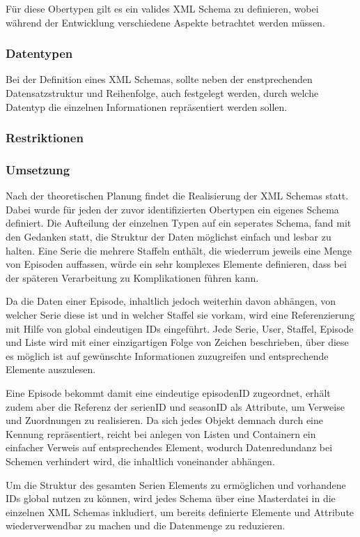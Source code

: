 \documentclass[a4paper]{article}
\begin{document}
Für diese Obertypen gilt es ein valides XML Schema zu definieren, wobei während der Entwicklung verschiedene Aspekte betrachtet werden müssen.  


\subsubsection{Datentypen}
Bei der Definition eines XML Schemas, sollte neben der enstprechenden Datensatzstruktur und Reihenfolge,
auch festgelegt werden, durch welche Datentyp die einzelnen Informationen repräsentiert werden sollen.


\subsubsection{Restriktionen}

\newpage
\subsubsection{Umsetzung}

Nach der theoretischen Planung findet die Realisierung der XML Schemas statt.
Dabei wurde für jeden der zuvor identifizierten Obertypen ein eigenes Schema definiert. Die Aufteilung der einzelnen Typen auf ein seperates Schema, fand mit den Gedanken statt, die Struktur der Daten möglichst einfach und lesbar zu halten. Eine Serie die mehrere Staffeln enthält, die wiederrum jeweils eine Menge von Episoden auffassen, würde ein sehr komplexes Elemente definieren, dass bei der späteren Verarbeitung zu Komplikationen führen kann.

Da die Daten einer Episode, inhaltlich jedoch weiterhin davon abhängen, von welcher Serie diese ist und in welcher Staffel sie vorkam, wird eine Referenzierung mit Hilfe von global eindeutigen IDs eingeführt. Jede Serie, User, Staffel, Episode und Liste wird mit einer einzigartigen Folge von Zeichen beschrieben, über diese es möglich ist auf gewünschte Informationen zuzugreifen und entsprechende Elemente auszulesen.

Eine Episode bekommt damit eine eindeutige episodenID zugeordnet, erhält zudem aber die Referenz der serienID und seasonID als Attribute, um Verweise und Zuordnungen zu realisieren. Da sich jedes Objekt demnach durch eine Kennung repräsentiert, reicht bei anlegen von Listen und Containern ein einfacher Verweis auf entsprechendes Element, wodurch Datenredundanz bei Schemen verhindert wird, die inhaltlich voneinander abhängen.

Um die Struktur des gesamten Serien Elements zu ermöglichen und vorhandene IDs global nutzen zu können, wird jedes Schema über eine Masterdatei in die einzelnen XML Schemas inkludiert, um bereits definierte Elemente und Attribute wiederverwendbar zu machen und die Datenmenge zu reduzieren.
\end{document}

